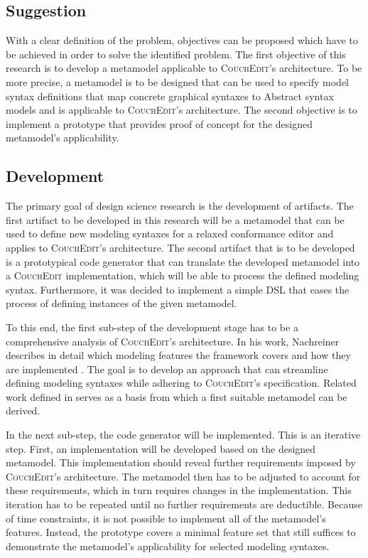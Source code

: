 \subsection{Suggestion}
With a clear definition of the problem, objectives can be proposed which have to be achieved in order to solve the identified problem. The first objective of this research is to develop a metamodel applicable to \textsc{CouchEdit}'s architecture. To be more precise, a metamodel is to be designed that can be used to specify model syntax definitions that map concrete graphical syntaxes to Abstract syntax models and is applicable to \textsc{CouchEdit}'s architecture. The second objective is to implement a prototype that provides proof of concept for the designed metamodel's applicability.


\subsection{Development}
The primary goal of design science research is the development of artifacts.
The first artifact to be developed in this research will be a metamodel that can be used to define new modeling syntaxes for a relaxed conformance editor and applies to \textsc{CouchEdit}'s architecture. The second artifact that is to be developed is a prototypical code generator that can translate the developed metamodel into a \textsc{CouchEdit} implementation, which will be able to process the defined modeling syntax. Furthermore, it was decided to implement a simple DSL that eases the process of defining instances of the given metamodel.

To this end, the first sub-step of the development stage has to be a comprehensive analysis of \textsc{CouchEdit}'s architecture. In his work, Nachreiner describes in detail which modeling features the framework covers and how they are implemented \cite{nachreiner_couchedit_2020}. The goal is to develop an approach that can streamline defining modeling syntaxes while adhering to \textsc{CouchEdit}'s specification. Related work defined in  serves as a basis from which a first suitable metamodel can be derived.

In the next sub-step, the code generator will be implemented. This is an iterative step. First, an implementation will be developed based on the designed metamodel. This implementation should reveal further requirements imposed by \textsc{CouchEdit}'s architecture. The metamodel then has to be adjusted to account for these requirements, which in turn requires changes in the implementation. This iteration has to be repeated until no further requirements are deductible. Because of time constraints, it is not possible to implement all of the metamodel's features. Instead, the prototype covers a minimal feature set that still suffices to demonstrate the metamodel's applicability for selected modeling syntaxes.

